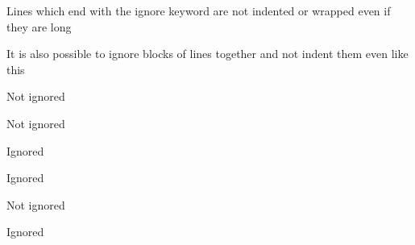 \documentclass{article}
\begin{document}
Lines which end with the ignore keyword are not indented or wrapped even if they are long %

It is also possible to ignore blocks
  of lines together and not indent them
    even like this

Not ignored


Not ignored


  Ignored


  Ignored


Not ignored


  Ignored
\end{document}
